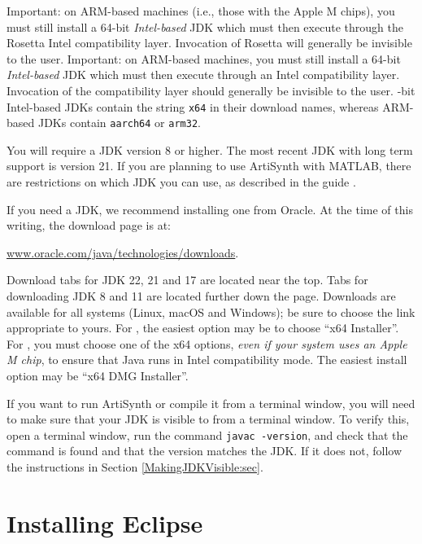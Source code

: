 \begin{sideblock}
\ifMacOS
Important: on ARM-based machines (i.e., those with the Apple M chips), you must
still install a 64-bit {\it Intel-based} JDK which must then execute through
the Rosetta Intel compatibility layer. Invocation of Rosetta will generally be
invisible to the user.
\else
Important: on ARM-based machines, you must still install a 64-bit {\it
Intel-based} JDK which must then execute through 
an Intel compatibility layer. Invocation of the compatibility layer
should generally be invisible to the user.
-bit Intel-based JDKs
contain the string {\tt x64} in their download names, whereas
ARM-based JDKs contain {\tt aarch64} or {\tt arm32}.
\end{sideblock}

You will require a JDK version 8 or higher. The most recent JDK with
long term support is version 21.  If you are planning to use
ArtiSynth with MATLAB, there are restrictions on which JDK you can use, as
described in the guide
.

If you need a JDK, we recommend installing one from Oracle.  At the time of
this writing, the download page is at:

\href{https://www.oracle.com/java/technologies/downloads/}%
{www.oracle.com/java/technologies/downloads}.

Download tabs for JDK 22, 21 and 17 are located near the top.  Tabs for
downloading JDK 8 and 11 are located further down the page.
Downloads are available for all systems ({\sf Linux}, {\sf macOS} and
{\sf Windows}); be sure to choose the link appropriate to yours.
\ifWindows
For \SYSTEM{}, the easiest option may be to choose ``{\sf x64 Installer}''.
\fi
\ifMacOS
For \SYSTEM{}, you must choose one of the {\sf x64} options,
{\it even if your system uses an Apple M chip}, to ensure
that Java runs in Intel compatibility mode. The
easiest install option may be ``{\sf x64 DMG Installer}''.
\fi

If you want to run ArtiSynth or compile it from a terminal window, you will
need to make sure that your JDK is visible to from a terminal window. To verify
this, open a terminal window, run the command {\tt javac -version}, and check
that the command is found and that the version matches the JDK.  If it does
not, follow the instructions in Section
\ref{MakingJDKVisible:sec}.

\section{Installing Eclipse}

